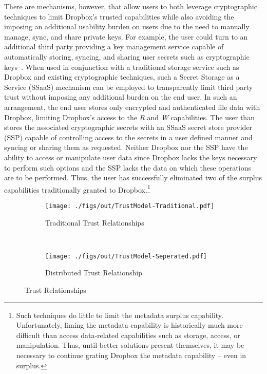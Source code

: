 There are mechanisms, however, that allow users to both leverage
cryptographic techniques to limit Dropbox's trusted capabilities while
also avoiding the imposing an additional usability burden on users due
to the need to manually manage, sync, and share private keys. For
example, the user could turn to an additional third party providing a
key management service capable of automatically storing, syncing, and
sharing user secrets such as cryptographic
keys~\cite{custos-trios}. When used in conjunction with a traditional
storage service such as Dropbox and existing cryptographic techniques,
such a Secret Storage as a Service (SSaaS) mechanism can be employed
to transparently limit third party trust without imposing any
additional burden on the end user. In such an arrangement, the end
user stores only encrypted and authenticated file data with Dropbox,
limiting Dropbox's access to the \emph{R} and \emph{W}
capabilities. The user than stores the associated cryptographic
secrets with an SSaaS secret store provider (SSP) capable of
controlling access to the secrets in a user defined manner and syncing
or sharing them as requested. Neither Dropbox nor the SSP have the
ability to access or manipulate user data since Dropbox lacks the keys
necessary to perform such options and the SSP lacks the data on which
these operations are to be performed. Thus, the user has successfully
eliminated two of the surplus capabilities traditionally granted to
Dropbox.\footnote{Such techniques do little to limit the metadata
  surplus capability. Unfortunately, liming the metadata capability is
  historically much more difficult than access data-related
  capabilities such as storage, access, or manipulation. Thus, until
  better solutions present themselves, it may be necessary to continue
  grating Dropbox the metadata capability -- even in surplus.}

\begin{figure}[t]
  \centering
  \begin{subfigure}[t]{0.48\textwidth}
    \centering
    \texttt{[image: ./figs/out/TrustModel-Traditional.pdf]}
    \caption{Traditional Trust Relationships}
    \label{fig:mitigation:trust:traditional}
  \end{subfigure}
  ~
  \begin{subfigure}[t]{0.48\textwidth}
    \centering
    \texttt{[image: ./figs/out/TrustModel-Seperated.pdf]}
    \caption{Distributed Trust Relationship}
    \label{fig:mitigation:trust:distributed}
  \end{subfigure}
  \caption{Trust Relationships}
  \label{fig:mitigation:trust}
\end{figure}

